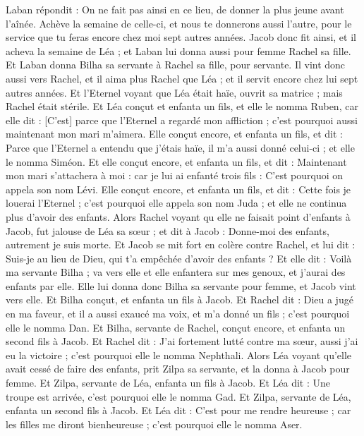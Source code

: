 \begin{multicols}{2}
Laban répondit : On ne fait pas ainsi en ce lieu, de donner la plus jeune avant l'aînée.
Achève la semaine de celle-ci, et nous te donnerons aussi l'autre, pour le service que tu feras encore chez moi sept autres années.
Jacob donc fit ainsi, et il acheva la semaine de Léa ; et Laban lui donna aussi pour femme Rachel sa fille.
Et Laban donna Bilha sa servante à Rachel sa fille, pour servante.
Il vint donc aussi vers Rachel, et il aima plus Rachel que Léa ; et il servit encore chez lui sept autres années.
Et l'Eternel voyant que Léa était haïe, ouvrit sa matrice ; mais Rachel était stérile.
Et Léa conçut et enfanta un fils, et elle le nomma Ruben, car elle dit : [C'est] parce que l'Eternel a regardé mon affliction ; c'est pourquoi aussi maintenant mon mari m'aimera.
Elle conçut encore, et enfanta un fils, et dit : Parce que l'Eternel a entendu que j'étais haïe, il m'a aussi donné celui-ci ; et elle le nomma Siméon.
Et elle conçut encore, et enfanta un fils, et dit : Maintenant mon mari s'attachera à moi : car je lui ai enfanté trois fils : C'est pourquoi on appela son nom Lévi.
Elle conçut encore, et enfanta un fils, et dit : Cette fois je louerai l'Eternel ; c'est pourquoi elle appela son nom Juda ; et elle ne continua plus d'avoir des enfants.
\VerseOne{}Alors Rachel voyant qu elle ne faisait point d'enfants à Jacob, fut jalouse de Léa sa sœur ; et dit à Jacob : Donne-moi des enfants, autrement je suis morte.
Et Jacob se mit fort en colère contre Rachel, et lui dit : Suis-je au lieu de Dieu, qui t'a empêchée d'avoir des enfants ?
Et elle dit : Voilà ma servante Bilha ; va vers elle et elle enfantera sur mes genoux, et j'aurai des enfants par elle.
Elle lui donna donc Bilha sa servante pour femme, et Jacob vint vers elle.
Et Bilha conçut, et enfanta un fils à Jacob.
Et Rachel dit : Dieu a jugé en ma faveur, et il a aussi exaucé ma voix, et m'a donné un fils ; c'est pourquoi elle le nomma Dan.
Et Bilha, servante de Rachel, conçut encore, et enfanta un second fils à Jacob.
Et Rachel dit : J'ai fortement lutté contre ma sœur, aussi j'ai eu la victoire ; c'est pourquoi elle le nomma Nephthali.
Alors Léa voyant qu'elle avait cessé de faire des enfants, prit Zilpa sa servante, et la donna à Jacob pour femme.
Et Zilpa, servante de Léa, enfanta un fils à Jacob.
Et Léa dit : Une troupe est arrivée, c'est pourquoi elle le nomma Gad.
Et Zilpa, servante de Léa, enfanta un second fils à Jacob.
Et Léa dit : C'est pour me rendre heureuse ; car les filles me diront bienheureuse ; c'est pourquoi elle le nomma Aser.

\end{multicols}
